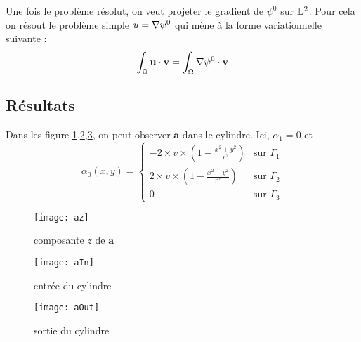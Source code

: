 

Une fois le problème résolut, on veut projeter le gradient de $\psi^0$ sur ${\mathbb{L}}^2$. Pour cela on résout le problème simple $u={\nabla}\psi^0$ qui mène à la forme variationnelle suivante :
\[ \int_\Omega \mathbf{u}\cdot\mathbf{v} = \int_\Omega {\nabla}\psi^0\cdot\mathbf{v} \]



\subsection{Résultats}
Dans les figure \ref{az},\ref{aIn},\ref{aOut}, on peut observer $\mathbf{a}$ dans le cylindre. Ici, $\alpha_1=0$ et 
\[ \alpha_0(x,y)= \begin{cases} -2\times v\times\left(1-\frac{x^2+y^2}{r^2}\right) &\mbox{sur } \Gamma_1\\
2\times v\times\left(1-\frac{x^2+y^2}{r^2}\right)&\mbox{sur } \Gamma_2\\
0 &\mbox{sur } \Gamma_3 \end{cases} \]

\begin{figure}[H]
\centering
\texttt{[image: az]}
\caption{composante $z$ de $\mathbf{a}$}
\label{az}
\end{figure}
\begin{figure}[H]
\centering
\texttt{[image: aIn]}
\caption{entrée du cylindre}
\label{aIn}
\end{figure}
\begin{figure}[H]
\centering
\texttt{[image: aOut]}
\caption{sortie du cylindre}
\label{aOut}
\end{figure}


